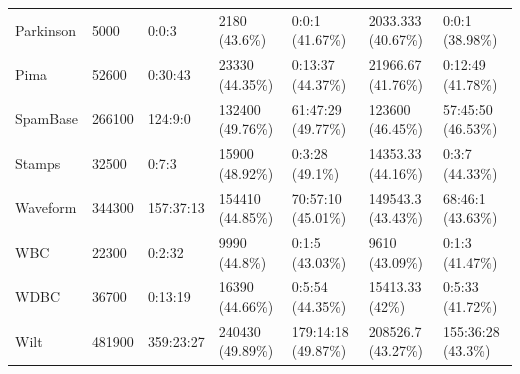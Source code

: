 \documentclass[11pt]{article}
\begin{document}
{\begin{table}[h!]
\begin{tabular}{|l|ll|ll|ll|}
        Parkinson & 5000 & 0:0:3 & 2180 (43.6\%) & 0:0:1 (41.67\%) & 2033.333 (40.67\%) & 0:0:1 (38.98\%) \\
        Pima & 52600 & 0:30:43 & 23330 (44.35\%) & 0:13:37 (44.37\%) & 21966.67 (41.76\%) & 0:12:49 (41.78\%) \\
        SpamBase & 266100 & 124:9:0 & 132400 (49.76\%) & 61:47:29 (49.77\%) & 123600 (46.45\%) & 57:45:50 (46.53\%) \\
        Stamps & 32500 & 0:7:3 & 15900 (48.92\%) & 0:3:28 (49.1\%) & 14353.33 (44.16\%) & 0:3:7 (44.33\%) \\
        Waveform & 344300 & 157:37:13 & 154410 (44.85\%) & 70:57:10 (45.01\%) & 149543.3 (43.43\%) & 68:46:1 (43.63\%) \\
        WBC & 22300 & 0:2:32 & 9990 (44.8\%) & 0:1:5 (43.03\%) & 9610 (43.09\%) & 0:1:3 (41.47\%) \\
        WDBC & 36700 & 0:13:19 & 16390 (44.66\%) & 0:5:54 (44.35\%) & 15413.33 (42\%) & 0:5:33 (41.72\%) \\
        Wilt & 481900 & 359:23:27 & 240430 (49.89\%) & 179:14:18 (49.87\%) & 208526.7 (43.27\%) & 155:36:28 (43.3\%) \\ \hline
\end{tabular}
\end{table}

}
\end{document}
